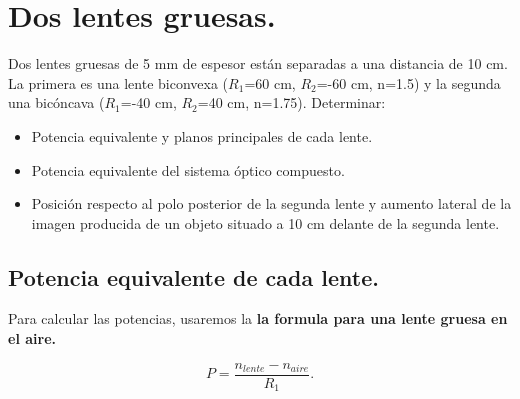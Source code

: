 \documentclass[a4paper,12pt]{article} %
\begin{document}
\vspace{\baselineskip}

\section{Dos lentes gruesas.}

\begin{justify}
	Dos lentes gruesas de 5 mm de espesor están separadas a una distancia de 10 cm. 
	La primera es una lente biconvexa (\(R_1\)=60 cm, \(R_2\)=-60 cm, n=1.5)
	y la segunda una bicóncava (\(R_1\)=-40 cm, \(R_2\)=40 cm, n=1.75). Determinar:
\end{justify}

\begin{itemize}
	\item Potencia equivalente y planos principales de cada lente. 
	\item Potencia equivalente del sistema óptico compuesto. 
	\item Posición respecto al polo posterior de la segunda lente y aumento lateral de la imagen producida de un objeto situado a 10 cm delante de la segunda lente. 
\end{itemize}

\vspace{\baselineskip}

\subsection{Potencia equivalente de cada lente.}

\begin{justify}
	Para calcular las potencias, usaremos la \textbf{la formula para una lente gruesa en el aire.}
\end{justify}

\[ P = \frac{n_{lente} - n_{aire}}{R_1}.\]
\end{document}
